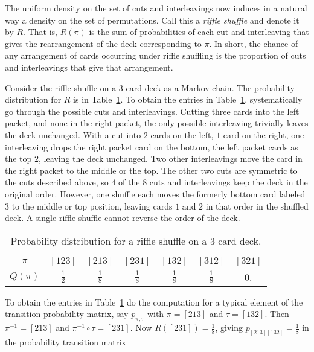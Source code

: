\documentclass[12pt]{article}
\begin{document}
The uniform density on the set of cuts and interleavings now induces in
a natural way a density on the set of permutations.  Call this a \emph{riffle
shuffle} and denote it by \( R \).  That is, \( R(\pi) \) is the sum of
probabilities of each cut and interleaving that gives the rearrangement
of the deck corresponding to \( \pi \).  In short, the chance of any
arrangement of cards occurring under riffle shuffling is the proportion
of cuts and interleavings that give that arrangement.

\begin{example}
    Consider the riffle shuffle on a \( 3 \)-card deck as a Markov
    chain. The probability distribution for \( R \) is in
    Table~\ref{tab:cardshuffling:riffle3}.  To obtain the entries in
    Table~\ref{tab:cardshuffling:riffle3}, 
    systematically go through the possible cuts and interleavings.
    Cutting three cards into the left packet, and none in the right packet, the only
    possible interleaving trivially leaves the deck unchanged.  With a
    cut into \( 2 \) cards on the left, \( 1 \) card on the right, one
    interleaving drops the right packet card on the bottom, the left
    packet cards as the top \( 2 \), leaving the deck unchanged.  Two
    other interleavings move the card in the right packet to
    the middle or the top.  The other two cuts are symmetric to the
    cuts described above, so \( 4 \) of the \( 8 \) cuts and
    interleavings keep the deck in the original order.  However, one
    shuffle each moves the formerly bottom card labeled \( 3 \) to the
    middle or top position, leaving cards \( 1 \) and \( 2 \) in that
    order in the shuffled deck.    A single riffle shuffle cannot
    reverse the order of the deck.

    \begin{table}
      \centering
      \caption{Probability distribution for a riffle shuffle on a $3$
        card deck. }
    \begin{tabular}{ccccccc}
        $\pi$    & $[123]$       & $[213]$       & $[231]$       & $[132]$       & $[312]$       & $[321]$ \\ 
        $Q(\pi)$ & $\frac{1}{2}$ & $\frac{1}{8}$ & $\frac{1}{8}$ & $\frac{1}{8}$ & $\frac{1}{8}$ & 0.      \\ 
    \end{tabular}
      \label{tab:cardshuffling:riffle3}
    \end{table}

    To obtain the entries in Table~\ref{tab:cardshuffling:riffle3} do
    the computation for a typical element of the transition
    probability matrix, say \( p_{\pi,\tau} \) with \( \pi = [213] \)
    and \( \tau = [132] \). Then \( \pi^{-1} = [213] \) and \( \pi^{-1}
    \circ \tau = [231] \).  Now \( R([231]) = \frac{1}{8} \), giving \(
    p_{[213] [132]} = \frac{1}{8} \) in the probability transition
    matrix


\end{example}
\end{document}
